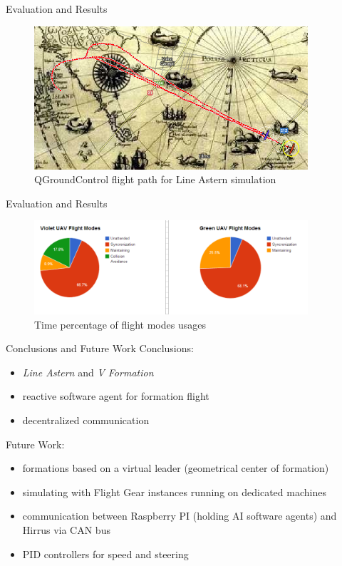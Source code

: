 \documentclass{beamer}
\begin{document}
\begin{frame}{Evaluation and Results}
\begin{center}
\begin{figure}[p]
\includegraphics[width=4in]{img/lineastern.png}
\caption{QGroundControl flight path for Line Astern simulation}
\end{figure}
\end{center}
\end{frame}

\begin{frame}{Evaluation and Results}
\begin{center}
\begin{figure}[p]
\includegraphics[width=4in]{img/flight-modes.png}
\caption{Time percentage of flight modes usages}
\end{figure}

\end{center}
\end{frame}

\begin{frame}{Conclusions and Future Work}
Conclusions:
\begin{itemize}
\item \textit{Line Astern} and \textit{V Formation}
\item reactive software agent for formation flight
\item decentralized communication
\end{itemize}
Future Work:
\begin{itemize}
\item formations based on a virtual leader (geometrical center of formation)
\item simulating with Flight Gear instances running on dedicated machines
\item communication between Raspberry PI (holding AI software agents) and Hirrus via CAN bus
\item PID controllers for speed and steering
\end{itemize}
\end{frame}
\end{document}

